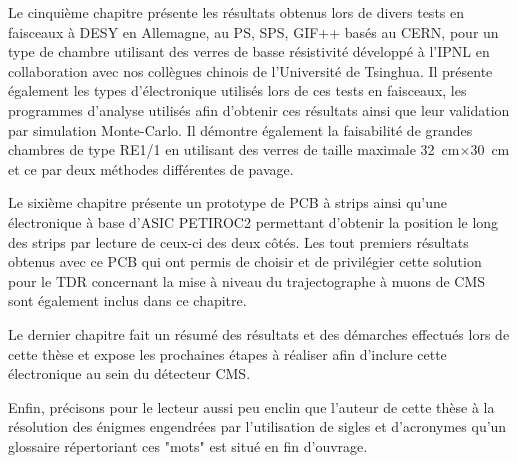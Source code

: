 Le cinquième chapitre présente les résultats obtenus lors de divers tests en faisceaux à DESY en Allemagne, au PS, SPS, GIF++ basés au CERN, pour un type de chambre utilisant des verres de basse résistivité développé à l'IPNL en collaboration avec nos collègues chinois de l'Université de Tsinghua. Il présente également les types d'électronique utilisés lors de ces tests en faisceaux, les programmes d'analyse utilisés afin d'obtenir ces résultats ainsi que leur validation par simulation Monte-Carlo. Il démontre également la faisabilité de grandes chambres de type RE1/1 en utilisant des verres de taille maximale \SI{32}{\centi\meter}$\times$\SI{30}{\centi\meter} et ce par deux méthodes différentes de pavage.

Le sixième chapitre présente un prototype de PCB à strips ainsi qu'une électronique à base d'ASIC PETIROC2 permettant d'obtenir la position le long des strips par lecture de ceux-ci des deux côtés. Les tout premiers résultats obtenus avec ce PCB qui ont permis de choisir et de privilégier cette solution pour le TDR concernant la mise à niveau du trajectographe à muons de CMS sont également inclus dans ce chapitre.

Le dernier chapitre fait un résumé des résultats et des démarches effectués lors de cette thèse et expose les prochaines étapes à réaliser afin d'inclure cette électronique au sein du détecteur CMS.

Enfin, précisons pour le lecteur aussi peu enclin que l'auteur de cette thèse à la résolution des énigmes engendrées par l'utilisation de sigles  et d'acronymes qu'un glossaire répertoriant ces "mots" est situé en fin d'ouvrage.


